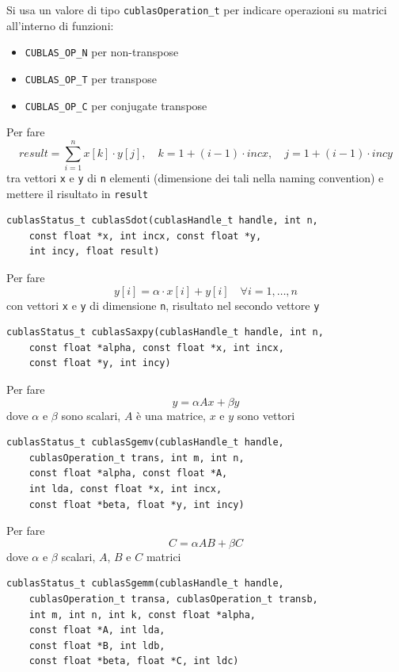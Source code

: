 Si usa un valore di tipo \texttt{cublasOperation\_t} per indicare operazioni su matrici all'interno di funzioni: 
\begin{itemize}
	\item \texttt{CUBLAS\_OP\_N} per non-transpose

	\item \texttt{CUBLAS\_OP\_T} per transpose

	\item \texttt{CUBLAS\_OP\_C} per conjugate transpose
\end{itemize}

Per fare
$$ result = \sum_{i=1}^{n} x[k] \cdot y[j], \quad k = 1 + (i-1) \cdot incx, \quad j = 1 + (i-1) \cdot incy $$
tra vettori \texttt{x} e \texttt{y} di \texttt{n} elementi (dimensione dei tali nella naming convention) e mettere il risultato in \texttt{result}
\begin{lstlisting}
cublasStatus_t cublasSdot(cublasHandle_t handle, int n, 
    const float *x, int incx, const float *y, 
    int incy, float result)
\end{lstlisting}

Per fare 
$$ y[i] = \alpha \cdot x[i] + y[i] \quad \forall i = 1, \dots, n $$
con vettori \texttt{x} e \texttt{y} di dimensione \texttt{n}, risultato nel secondo vettore \texttt{y}
\begin{lstlisting}
cublasStatus_t cublasSaxpy(cublasHandle_t handle, int n,
    const float *alpha, const float *x, int incx, 
    const float *y, int incy)
\end{lstlisting}

Per fare 
$$ y = \alpha Ax + \beta y$$
dove $\alpha$ e $\beta$ sono scalari, $A$ è una matrice, $x$ e $y$ sono vettori
\begin{lstlisting}
cublasStatus_t cublasSgemv(cublasHandle_t handle, 
    cublasOperation_t trans, int m, int n, 
    const float *alpha, const float *A, 
    int lda, const float *x, int incx, 
    const float *beta, float *y, int incy)
\end{lstlisting}

Per fare
$$ C = \alpha AB + \beta C$$
dove $\alpha$ e $\beta$ scalari, $A$, $B$ e $C$ matrici
\begin{lstlisting}
cublasStatus_t cublasSgemm(cublasHandle_t handle,
    cublasOperation_t transa, cublasOperation_t transb,
    int m, int n, int k, const float *alpha,
    const float *A, int lda,
    const float *B, int ldb,
    const float *beta, float *C, int ldc)
\end{lstlisting}

